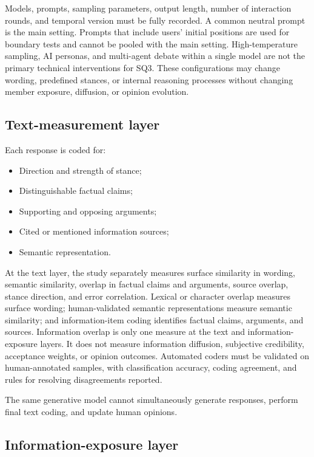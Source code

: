\documentclass[11pt,a4paper]{article}
\begin{document}
Models, prompts, sampling parameters, output length, number of interaction rounds, and temporal version must be fully recorded. A common neutral prompt is the main setting. Prompts that include users' initial positions are used for boundary tests and cannot be pooled with the main setting. High-temperature sampling, AI personas, and multi-agent debate within a single model are not the primary technical interventions for SQ3. These configurations may change wording, predefined stances, or internal reasoning processes without changing member exposure, diffusion, or opinion evolution.

\subsection{Text-measurement layer}

Each response is coded for:

\begin{itemize}
\item Direction and strength of stance;
\item Distinguishable factual claims;
\item Supporting and opposing arguments;
\item Cited or mentioned information sources;
\item Semantic representation.
\end{itemize}

At the text layer, the study separately measures surface similarity in wording, semantic similarity, overlap in factual claims and arguments, source overlap, stance direction, and error correlation. Lexical or character overlap measures surface wording; human-validated semantic representations measure semantic similarity; and information-item coding identifies factual claims, arguments, and sources. Information overlap is only one measure at the text and information-exposure layers. It does not measure information diffusion, subjective credibility, acceptance weights, or opinion outcomes. Automated coders must be validated on human-annotated samples, with classification accuracy, coding agreement, and rules for resolving disagreements reported.

The same generative model cannot simultaneously generate responses, perform final text coding, and update human opinions.

\subsection{Information-exposure layer}
\end{document}
